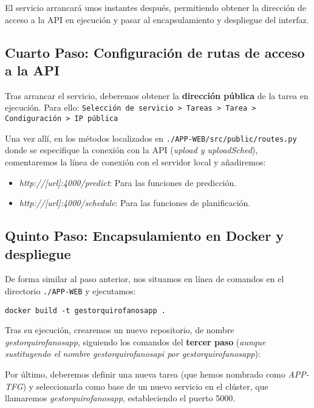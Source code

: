 El servicio arrancará unos instantes después, permitiendo obtener la dirección de acceso a la API en ejecución y pasar al encapsulamiento y despliegue del interfaz.

\subsection{Cuarto Paso: Configuración de rutas de acceso a la API}

Tras arrancar el servicio, deberemos obtener la \textbf{dirección pública} de la tarea en ejecución. Para ello: \texttt{Selección de servicio > Tareas > Tarea > Condiguración > IP pública}


Una vez allí, en los métodos localizados en \texttt{./APP-WEB/src/public/routes.py} donde se especifique la conexión con la API  (\textit{upload y uploadSched}), comentaremos la línea de conexión con el servidor local y añadiremos:

\begin{itemize}
    \item \textit{http://[url]:4000/predict}: Para las funciones de predicción.
    \item \textit{http://[url]:4000/schedule}: Para las funciones de planificación.
\end{itemize}


\subsection{Quinto Paso: Encapsulamiento en Docker y despliegue}

De forma similar al paso anterior, nos situamos en línea de comandos en el directorio \texttt{./APP-WEB} y ejecutamos:

\texttt{docker build -t gestorquirofanosapp .}

Tras su ejecución, crearemos un nuevo repositorio, de nombre \textit{gestorquirofanosapp}, siguiendo los comandos del \textbf{tercer paso} (\textit{aunque sustituyendo el nombre gestorquirofanosapi por gestorquirofanosapp}):


Por último, deberemos definir una nueva tarea (que hemos nombrado como \textit{APP-TFG}) y seleccionarla como base de un nuevo servicio en el clúster, que llamaremos \textit{gestorquirofanosapp}, estableciendo el puerto 5000.


